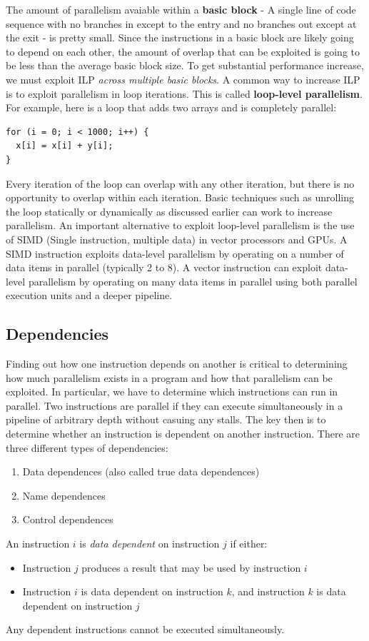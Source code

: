 \documentclass[11pt]{article}
\begin{document}
\noindent
The amount of parallelism avaiable within a \textbf{basic block} - A single line of code sequence with no branches in except to the entry and no branches out except at the exit - is pretty small. Since the instructions in a basic block are likely going to depend on each other, the amount of overlap that can be exploited is going to be less than the average basic block size. To get substantial performance increase, we must exploit ILP \textit{across multiple basic blocks}.
\n
A common way to increase ILP is to exploit parallelism in loop iterations. This is called \textbf{loop-level parallelism}. For example, here is a loop that adds two arrays and is completely parallel:
\begin{lstlisting}[caption={Example of parallel loop}, captionpos=b]
for (i = 0; i < 1000; i++) {
  x[i] = x[i] + y[i];
}
\end{lstlisting}
\noindent
Every iteration of the loop can overlap with any other iteration, but there is no opportunity to overlap within each iteration. Basic techniques such as unrolling the loop statically or dynamically as discussed earlier can work to increase parallelism. An important alternative to exploit loop-level parallelism is the use of SIMD (Single instruction, multiple data) in vector processors and GPUs. A SIMD instruction exploits data-level parallelism by operating on a number of data items in parallel (typically 2 to 8). A vector instruction can exploit data-level parallelism by operating on many data items in parallel using both parallel execution units and a deeper pipeline.

\subsection{Dependencies}
Finding out how one instruction depends on another is critical to determining how much parallelism exists in a program and how that parallelism can be exploited. In particular, we have to determine which instructions can run in parallel. Two instructions are parallel if they can execute simultaneously in a pipeline of arbitrary depth without casuing any stalls. The key then is to determine whether an instruction is dependent on another instruction.
\n
There are three different types of dependencies:
\begin{enumerate}
\item Data dependences (also called true data dependences)
\item Name dependences
\item Control dependences
\end{enumerate}
\noindent
An instruction $i$ is \textit{data dependent} on instruction $j$ if either:
\begin{itemize}
\item Instruction $j$ produces a result that may be used by instruction $i$
\item Instruction $i$ is data dependent on instruction $k$, and instruction $k$ is data dependent on instruction $j$
\end{itemize}
Any dependent instructions cannot be executed simultaneously. 
\end{document}
